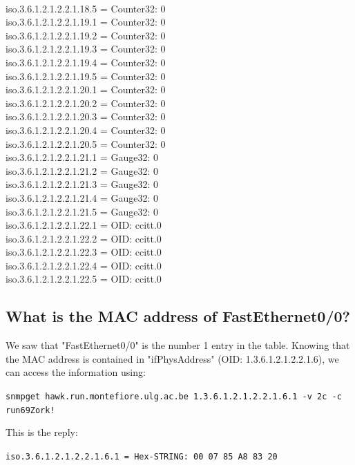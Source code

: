 \documentclass[a4paper,titlepage]{article}
\begin{document}
\begin{center}
{\\iso.3.6.1.2.1.2.2.1.18.5 = Counter32: 0
\\iso.3.6.1.2.1.2.2.1.19.1 = Counter32: 0
\\iso.3.6.1.2.1.2.2.1.19.2 = Counter32: 0
\\iso.3.6.1.2.1.2.2.1.19.3 = Counter32: 0
\\iso.3.6.1.2.1.2.2.1.19.4 = Counter32: 0
\\iso.3.6.1.2.1.2.2.1.19.5 = Counter32: 0
\\iso.3.6.1.2.1.2.2.1.20.1 = Counter32: 0
\\iso.3.6.1.2.1.2.2.1.20.2 = Counter32: 0
\\iso.3.6.1.2.1.2.2.1.20.3 = Counter32: 0
\\iso.3.6.1.2.1.2.2.1.20.4 = Counter32: 0
\\iso.3.6.1.2.1.2.2.1.20.5 = Counter32: 0
\\iso.3.6.1.2.1.2.2.1.21.1 = Gauge32: 0
\\iso.3.6.1.2.1.2.2.1.21.2 = Gauge32: 0
\\iso.3.6.1.2.1.2.2.1.21.3 = Gauge32: 0
\\iso.3.6.1.2.1.2.2.1.21.4 = Gauge32: 0
\\iso.3.6.1.2.1.2.2.1.21.5 = Gauge32: 0
\\iso.3.6.1.2.1.2.2.1.22.1 = OID: ccitt.0
\\iso.3.6.1.2.1.2.2.1.22.2 = OID: ccitt.0
\\iso.3.6.1.2.1.2.2.1.22.3 = OID: ccitt.0
\\iso.3.6.1.2.1.2.2.1.22.4 = OID: ccitt.0
\\iso.3.6.1.2.1.2.2.1.22.5 = OID: ccitt.0}
\end{center}

	\subsection{What is the MAC address of FastEthernet0/0?}
We saw that "FastEthernet0/0" is the number 1 entry in the table. Knowing that the MAC address is contained in "ifPhysAddress" (OID: 1.3.6.1.2.1.2.2.1.6), we can access the information using: 
\begin{center}
	\texttt{snmpget hawk.run.montefiore.ulg.ac.be 1.3.6.1.2.1.2.2.1.6.1 -v 2c -c run69Zork!}
\end{center}
This is the reply: 
\begin{center}
	\texttt{iso.3.6.1.2.1.2.2.1.6.1 = Hex-STRING: 00 07 85 A8 83 20 }
\end{center}
\end{document}
